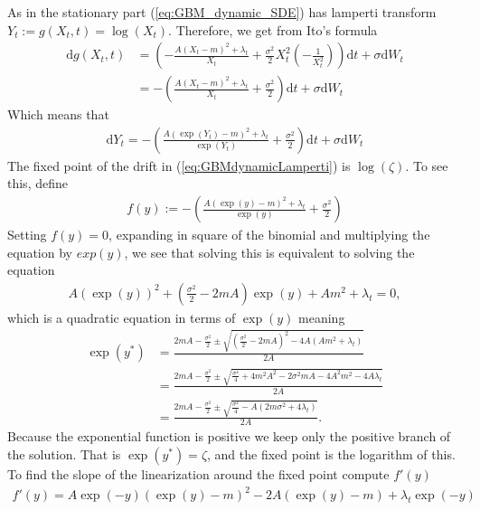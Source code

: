 As in the stationary part (\ref{eq:GBM_dynamic_SDE}) has lamperti transform $Y_t:= g(X_t, t) = \log(X_t)$. Therefore, we get from Ito's formula
\begin{align}
    \mathrm{d}g(X_t, t) &= \left(-\frac{A\left(X_t-m\right)^2 + \lambda_t}{X_t} + \frac{\sigma^2}{2}X_t^2\left(-\frac{1}{X_t^{2}}\right)\right)\mathrm{d}t + \sigma \mathrm{d}W_t \nonumber \\
    &= -\left(\frac{A\left(X_t-m\right)^2 + \lambda_t}{X_t} + \frac{\sigma^2}{2}\right)\mathrm{d}t + \sigma \mathrm{d}W_t
\end{align}
Which means that
\begin{align}
    \mathrm{d}Y_t = - \left(\frac{A\left(\exp\left(Y_t\right)-m\right)^2 + \lambda_t}{\exp(Y_t)} + \frac{\sigma^2}{2}\right)\mathrm{d}t + \sigma \mathrm{d}W_t \label{eq:GBMdynamicLamperti}
\end{align}
The fixed point of the drift in (\ref{eq:GBMdynamicLamperti}) is $\log\left(\zeta\right)$. To see this, define
\begin{align}
    f(y) := -\left(\frac{A\left(\exp\left(y\right)-m\right)^2 + \lambda_t}{\exp(y)} + \frac{\sigma^2}{2}\right)
\end{align}
Setting $f(y) = 0$, expanding in square of the binomial and multiplying the equation by $exp(y)$, we see that solving this is equivalent to solving the equation
\begin{align}
    A\left(\exp\left(y\right)\right)^2 + \left(\frac{\sigma^2}{2} - 2mA\right)\exp\left(y\right) + Am^2 + \lambda_t = 0,
\end{align}
which is a quadratic equation in terms of $\exp(y)$ meaning
\begin{align}
    \exp(y^*) &= \frac{2mA - \frac{\sigma^2}{2}\pm\sqrt{\left(\frac{\sigma^2}{2} - 2mA\right)^2 - 4A\left(Am^2 + \lambda_t\right)}}{2A}\nonumber \\
    &= \frac{2mA - \frac{\sigma^2}{2}\pm\sqrt{\frac{\sigma^4}{4} + 4m^2A^2 - 2\sigma^2mA-4A^2m^2-4A\lambda_t}}{2A}\nonumber \\
    &= \frac{2mA - \frac{\sigma^2}{2}\pm\sqrt{\frac{\sigma^4}{4}-A\left(2m\sigma^2 + 4\lambda_t\right)}}{2A}.
\end{align}
Because the exponential function is positive we keep only the positive branch of the solution. That is $\exp\left(y^*\right) = \zeta$, and the fixed point is the logarithm of this. To find the slope of the linearization around the fixed point compute $f'(y)$
\begin{align}
    f'(y) = A\exp(-y)\left(\exp(y) - m\right)^2 - 2A\left(\exp(y) - m\right) + \lambda_t\exp(-y)
\end{align}
